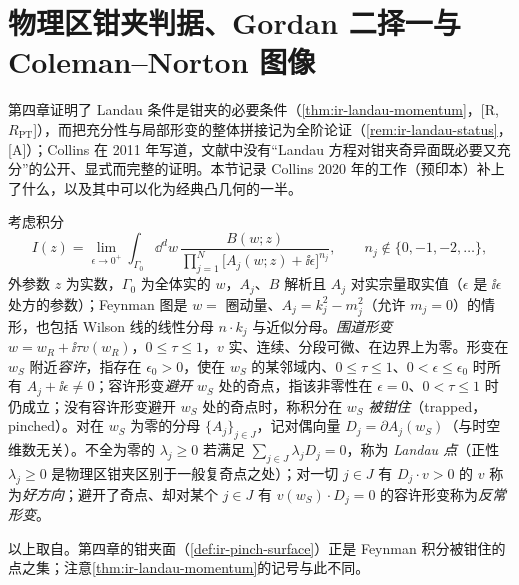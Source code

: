 \section{物理区钳夹判据、Gordan 二择一与 Coleman--Norton 图像}\label{sec:front-landau}

第四章证明了 Landau 条件是钳夹的必要条件（\cref{thm:ir-landau-momentum}，[R, $R_{\mathrm{PT}}$]），而把充分性与局部形变的整体拼接记为全阶论证（\cref{rem:ir-landau-status}，[A]）；Collins 在 2011 年写道，文献中没有“Landau 方程对钳夹奇异面既必要又充分”的公开、显式而完整的证明\cite[第~5.4.3~节，第~110~页]{Collins2011}。本节记录 Collins 2020 年的工作\cite{Collins:2020euz}（预印本）补上了什么，以及其中可以化为经典凸几何的一半。

\begin{definition}\label{def:front-trap}
考虑积分
\begin{equation}\label{eq:front-collins-integral}
I(z)=\lim_{\epsilon\to0^+}\int_{\Gamma_0}\dd^dw\,\frac{B(w;z)}{\prod_{j=1}^N\bigl[A_j(w;z)+\ii\epsilon\bigr]^{n_j}},\qquad n_j\notin\{0,-1,-2,\dots\},
\end{equation}
外参数 $z$ 为实数，$\Gamma_0$ 为全体实的 $w$，$A_j$、$B$ 解析且 $A_j$ 对实宗量取实值（$\epsilon$ 是 $\ii\epsilon$ 处方的参数）；Feynman 图是 $w=$ 圈动量、$A_j=k_j^2-m_j^2$（允许 $m_j=0$）的情形，也包括 Wilson 线的线性分母 $n\cdot k_j$ 与近似分母。\emph{围道形变} $w=w_R+\ii\tau v(w_R)$，$0\le\tau\le1$，$v$ 实、连续、分段可微、在边界上为零。形变在 $w_S$ 附近\emph{容许}，指存在 $\epsilon_0>0$，使在 $w_S$ 的某邻域内、$0\le\tau\le1$、$0<\epsilon\le\epsilon_0$ 时所有 $A_j+\ii\epsilon\ne0$；容许形变\emph{避开} $w_S$ 处的奇点，指该非零性在 $\epsilon=0$、$0<\tau\le1$ 时仍成立；没有容许形变避开 $w_S$ 处的奇点时，称积分在 $w_S$ \emph{被钳住}（trapped，pinched）。对在 $w_S$ 为零的分母 $\{A_j\}_{j\in J}$，记对偶向量 $D_j=\partial A_j(w_S)$（与时空维数无关）。不全为零的 $\lambda_j\ge0$ 若满足 $\sum_{j\in J}\lambda_jD_j=0$，称为 \emph{Landau 点}（正性 $\lambda_j\ge0$ 是物理区钳夹区别于一般复奇点之处）；对一切 $j\in J$ 有 $D_j\cdot v>0$ 的 $v$ 称为\emph{好方向}；避开了奇点、却对某个 $j\in J$ 有 $v(w_S)\cdot D_j=0$ 的容许形变称为\emph{反常形变}。
\end{definition}

以上取自\cite[第~II~节，定义~1--7、15]{Collins:2020euz}。第四章的钳夹面（\cref{def:ir-pinch-surface}）正是 Feynman 积分被钳住的点之集；注意\cref{thm:ir-landau-momentum}的记号与此不同。

